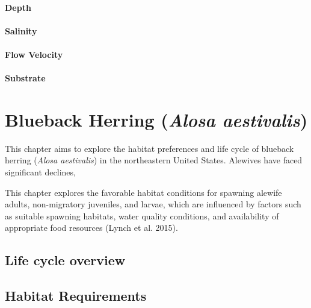 \documentclass[
]{book}
\begin{document}
\hypertarget{depth-5}{%
\subsubsection{Depth}\label{depth-5}}

\hypertarget{salinity-5}{%
\subsubsection{Salinity}\label{salinity-5}}

\hypertarget{flow-velocity-5}{%
\subsubsection{Flow Velocity}\label{flow-velocity-5}}

\hypertarget{substrate-5}{%
\subsubsection{Substrate}\label{substrate-5}}

\hypertarget{blueback-herring-alosa-aestivalis}{%
\chapter{\texorpdfstring{Blueback Herring (\emph{Alosa aestivalis})}{Blueback Herring (Alosa aestivalis)}}\label{blueback-herring-alosa-aestivalis}}

This chapter aims to explore the habitat preferences and life cycle of blueback herring (\emph{Alosa aestivalis}) in the northeastern United States.
Alewives have faced significant declines,

This chapter explores the favorable habitat conditions for spawning alewife adults, non-migratory juveniles, and larvae, which are influenced by factors such as suitable spawning habitats, water quality conditions, and availability of appropriate food resources (Lynch et al. 2015).

\hypertarget{life-cycle-overview-1}{%
\section{Life cycle overview}\label{life-cycle-overview-1}}

\hypertarget{habitat-requirements-1}{%
\section{Habitat Requirements}\label{habitat-requirements-1}}
\end{document}
